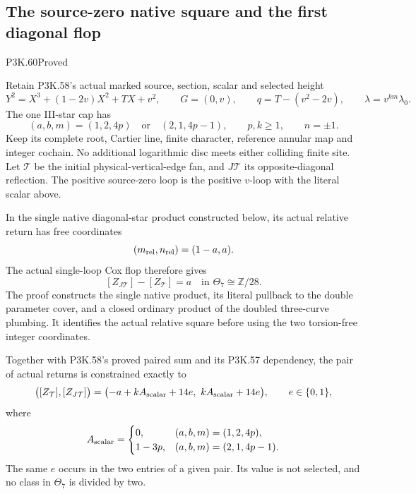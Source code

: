 \subsection{The source-zero native square and the first diagonal flop}
\begin{statement}{P3K.60}{Proved}

Retain P3K.58's actual marked source, section, scalar and selected height
\[
 Y^2=X^3+(1-2v)X^2+TX+v^2,\qquad G=(0,v),\qquad
 q=T-(v^2-2v),\qquad \lambda=v^{km}\lambda_0 .
\]
The one III-star cap has
\[
 (a,b,m)=(1,2,4p)\quad\text{or}\quad(2,1,4p-1),
 \qquad p,k\ge1,\qquad n=\pm1 .
\]
Keep its complete root, Cartier line, finite character, reference
annular map and integer cochain. No additional logarithmic disc
meets either colliding finite site. Let \(\mathcal T\) be the initial
physical-vertical-edge fan, and \(J\mathcal T\) its opposite-diagonal
reflection. The positive source-zero loop is the positive \(v\)-loop
with the literal scalar above.

In the single native diagonal-star product constructed below, its
actual relative return has free coordinates
\[
                              (m_{\rm rel},n_{\rm rel})=(1-a,a).
\]
The actual single-loop Cox flop therefore gives
\[
                   [Z_{J\mathcal T}]-[Z_{\mathcal T}]
                                  =a\quad\text{in }\Theta_7\cong\mathbb Z/28.
\]
The proof constructs the single native product, its literal pullback
to the double parameter cover, and a closed ordinary product of
the doubled three-curve plumbing. It identifies the actual relative
square before using the two torsion-free integer coordinates.

Together with P3K.58's proved paired sum and its P3K.57 dependency,
the pair of actual returns is constrained exactly to
\[
 \bigl([Z_{\mathcal T}],[Z_{J\mathcal T}]\bigr)
   =\bigl(-a+kA_{\rm scalar}+14e,\ kA_{\rm scalar}+14e\bigr),
       \qquad e\in\{0,1\},
\]
where
\[
 A_{\rm scalar}=
 \begin{cases}
 0,&(a,b,m)=(1,2,4p),\\
 1-3p,&(a,b,m)=(2,1,4p-1).
 \end{cases}
\]
The same \(e\) occurs in the two entries of a given pair. Its value
is not selected, and no class in \(\Theta_7\) is divided by two.
\end{statement}
